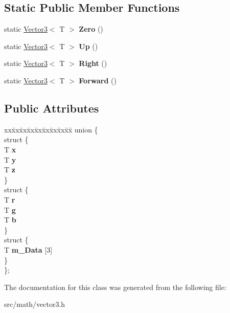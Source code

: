 \subsection*{Static Public Member Functions}
\begin{DoxyCompactItemize}
\item 
\mbox{\label{class_vector3_abc8704beb5df7d0a172e02e485f8eff6}} 
static \mbox{\hyperlink{class_vector3}{Vector3}}$<$ T $>$ {\bfseries Zero} ()
\item 
\mbox{\label{class_vector3_ad9f65478b9e6ca19757607ea12ce3e37}} 
static \mbox{\hyperlink{class_vector3}{Vector3}}$<$ T $>$ {\bfseries Up} ()
\item 
\mbox{\label{class_vector3_aea1141c0e5e40b704c6f25d63b6050c7}} 
static \mbox{\hyperlink{class_vector3}{Vector3}}$<$ T $>$ {\bfseries Right} ()
\item 
\mbox{\label{class_vector3_ac581e1b48b6dab97126554325eff6239}} 
static \mbox{\hyperlink{class_vector3}{Vector3}}$<$ T $>$ {\bfseries Forward} ()
\end{DoxyCompactItemize}
\subsection*{Public Attributes}
\begin{DoxyCompactItemize}
\item 
\mbox{\label{class_vector3_a0ca02225d7ab80b2f2d05bc8586e391e}} 
\begin{tabbing}
xx\=xx\=xx\=xx\=xx\=xx\=xx\=xx\=xx\=\kill
union \{\\
\mbox{\label{union_vector3_1_1_0D16_a241bf9666ea6029f94f80706cc4d40f0}} 
\>struct \{\\
\>\>T {\bfseries x}\\
\>\>T {\bfseries y}\\
\>\>T {\bfseries z}\\
\>\} \\
\mbox{\label{union_vector3_1_1_0D16_a715b07e523b1f755d5865b9a3f5202ec}} 
\>struct \{\\
\>\>T {\bfseries r}\\
\>\>T {\bfseries g}\\
\>\>T {\bfseries b}\\
\>\} \\
\mbox{\label{union_vector3_1_1_0D16_a0ab1d7181775c9180a11f5b0e3efef8d}} 
\>struct \{\\
\>\>T {\bfseries m\_Data} \mbox{[}3\mbox{]}\\
\>\} \\
\}; \\

\end{tabbing}\end{DoxyCompactItemize}


The documentation for this class was generated from the following file\+:\begin{DoxyCompactItemize}
\item 
src/math/vector3.\+h\end{DoxyCompactItemize}
